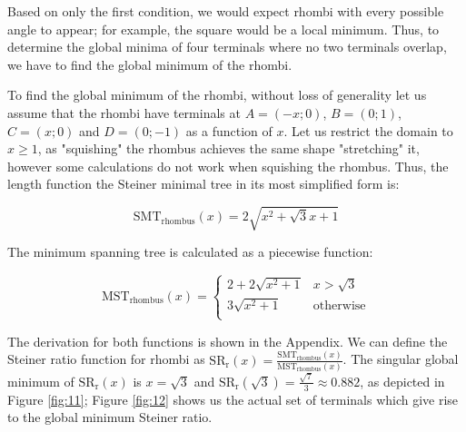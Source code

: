 \documentclass{mpaper}
\begin{document}
Based on only the first condition, we would expect rhombi with every possible angle to appear; for example, the square would be a local minimum. Thus, to determine the global minima of four terminals where no two terminals overlap, we have to find the global minimum of the rhombi.

To find the global minimum of the rhombi, without loss of generality let us assume that the rhombi have terminals at $A=(-x;0)$, $B=(0;1)$, $C=(x;0)$ and $D=(0;-1)$ as a function of $x$. Let us restrict the domain to $x\geq1$, as "squishing" the rhombus achieves the same shape "stretching" it, however some calculations do not work when squishing the rhombus. Thus, the length function the Steiner minimal tree in its most simplified form is:

\begin{equation}
  \label{eq:1}
  \operatorname{SMT_{rhombus}}(x)=2\sqrt{x^2+\sqrt{3}x+1}
\end{equation}

The minimum spanning tree is calculated as a piecewise function:

\begin{equation}
  \label{eq:2}
  \operatorname{MST_{rhombus}}(x)=  
  \begin{cases} 
    2+2\sqrt{x^2+1} & x >\sqrt{3} \\
    3\sqrt{x^2+1} & \text{otherwise} \\
  \end{cases}
\end{equation}

The derivation for both functions is shown in the Appendix. We can define the Steiner ratio function for rhombi as $\operatorname{SR_r}(x) = \frac{\operatorname{SMT_{rhombus}}(x)}{\operatorname{MST_{rhombus}}(x)}$. The singular global minimum of $\operatorname{SR_r}(x)$ is $x=\sqrt{3}$ and $\operatorname{SR_r}(\sqrt{3})=\frac{\sqrt{7}}{3}\approx 0.882$, as depicted in Figure \ref{fig:11}; Figure \ref{fig:12} shows us the actual set of terminals which give rise to the global minimum Steiner ratio.
\end{document}

